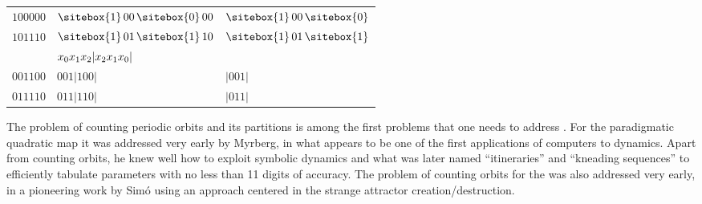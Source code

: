\begin{description}
\begin{table}
\begin{tabular}{|lll|}
 $100000$ & $\sitebox{1}\,00\,\sitebox{0}\,00$ & $\sitebox{1}\,00\,\sitebox{0}$\\
 $101110$ & $\sitebox{1}\,01\,\sitebox{1}\,10$ & $\sitebox{1}\,01\,\sitebox{1}$\\
\hline
 & $ x_0  x_1 x_2 | x_2 x_1 x_0|$ &
\\ [0.5ex]
 $001100$ & $001|100|$ & $|001|$\\
 $011110$ & $011|110|$ & $|011|$\\
[1ex]
\hline
\end{tabular}
\end{table}


                                                        \toCB
The problem of counting periodic orbits and its partitions is among the
first problems that one needs to address%
. For
the paradigmatic quadratic map it was addressed very early by
 {Myrberg}, in what
appears to be one of the first applications of computers to
dynamics. Apart
from counting orbits, he knew well how to exploit symbolic dynamics and
what was later named ``itineraries'' and ``kneading
sequences'' to efficiently tabulate parameters with no less
than 11 digits of accuracy. The problem of counting orbits for the
{\HenonMap} was also addressed very early, in a pioneering work by
Sim{\'o} using an approach centered in the strange attractor
creation/destruction.


\end{description}
